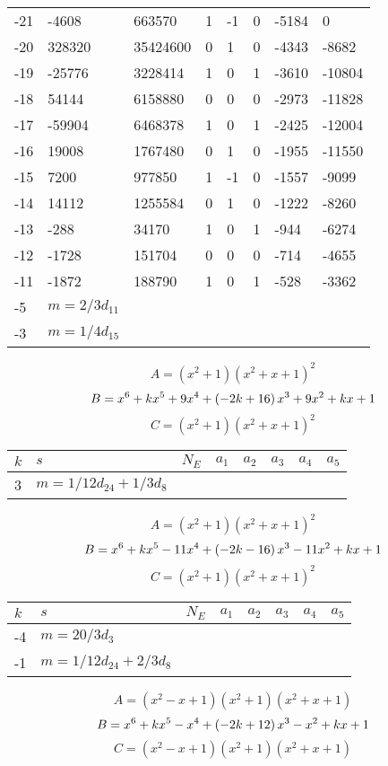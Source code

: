 \documentclass{amsart}
\begin{document}
\begin{longtable}{|l|l|l|lllll|}
-21&-4608&663570&1&-1&0&-5184&0\\
-20&328320&35424600&0&1&0&-4343&-8682\\
-19&-25776&3228414&1&0&1&-3610&-10804\\
-18&54144&6158880&0&0&0&-2973&-11828\\
-17&-59904&6468378&1&0&1&-2425&-12004\\
-16&19008&1767480&0&1&0&-1955&-11550\\
-15&7200&977850&1&-1&0&-1557&-9099\\
-14&14112&1255584&0&1&0&-1222&-8260\\
-13&-288&34170&1&0&1&-944&-6274\\
-12&-1728&151704&0&0&0&-714&-4655\\
-11&-1872&188790&1&0&1&-528&-3362\\
-5&$m=2/3d_{11}$&&\multicolumn{5}{c|}{}\\
-3&$m=1/4d_{15}$&&\multicolumn{5}{c|}{}\\
\hline
\end{longtable}
$$A=(x^2
 + 1)(x^2
 + x
 + 1)^{2}$$
$$B=x^6
 + k\*x^5
 + 9\*x^4
 + \left(-2\*k
 + 16\right) \*x^3
 + 9\*x^2
 + k\*x
 + 1$$
$$C=(x^2
 + 1)(x^2
 + x
 + 1)^{2}$$
\begin{longtable}{|l|l|l|lllll|}
\hline
$k$ & $s$ & $N_E$ & $a_1$ & $a_2$ & $a_3$ & $a_4$ & $a_5$\\
\hline
3&$m=1/12d_{24}+1/3d_{8}$&&\multicolumn{5}{c|}{}\\
\hline
\end{longtable}
$$A=(x^2
 + 1)(x^2
 + x
 + 1)^{2}$$
$$B=x^6
 + k\*x^5
 - 11\*x^4
 + \left(-2\*k
 - 16\right) \*x^3
 - 11\*x^2
 + k\*x
 + 1$$
$$C=(x^2
 + 1)(x^2
 + x
 + 1)^{2}$$
\begin{longtable}{|l|l|l|lllll|}
\hline
$k$ & $s$ & $N_E$ & $a_1$ & $a_2$ & $a_3$ & $a_4$ & $a_5$\\
\hline
-4&$m=20/3d_{3}$&&\multicolumn{5}{c|}{}\\
-1&$m=1/12d_{24}+2/3d_{8}$&&\multicolumn{5}{c|}{}\\
\hline
\end{longtable}
$$A=(x^2
 - x
 + 1)(x^2
 + 1)(x^2
 + x
 + 1)$$
$$B=x^6
 + k\*x^5
 - x^4
 + \left(-2\*k
 + 12\right) \*x^3
 - x^2
 + k\*x
 + 1$$
$$C=(x^2
 - x
 + 1)(x^2
 + 1)(x^2
 + x
 + 1)$$
\end{document}
